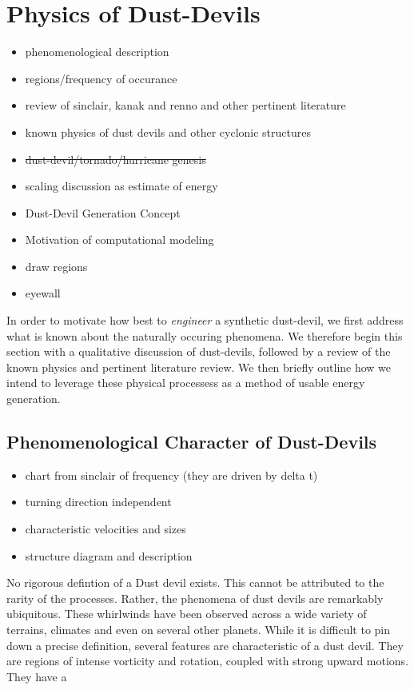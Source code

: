 \section{Physics of Dust-Devils}
\label{sec:physics}
\begin{itemize}
\item phenomenological description
\item regions/frequency of occurance
\item review of sinclair, kanak and renno and other pertinent literature
\item known physics of dust devils and other cyclonic structures
\item \st{dust-devil/tornado/hurricane genesis}
\item scaling discussion as estimate of energy
\item Dust-Devil Generation Concept
\item Motivation of computational modeling
\item draw regions
\item eyewall
\end{itemize}

In order to motivate how best to \textit{engineer} a synthetic
dust-devil, we first address what is known about the naturally occuring
phenomena. We therefore begin this section with a qualitative discussion
of dust-devils, followed by a review of the known physics and pertinent 
literature review. We then briefly outline how we intend to leverage
these physical processess as a method of usable energy generation. 


\subsection{Phenomenological Character of Dust-Devils}
\begin{itemize}
 \item chart from sinclair of frequency (they are driven by delta t)
 \item turning direction independent
 \item characteristic velocities and sizes
 \item structure diagram and description
\end{itemize}

No rigorous defintion of a Dust devil exists. This cannot be attributed
to the rarity of the processes. Rather, the phenomena of dust devils are
remarkably ubiquitous. These whirlwinds have been
observed across a wide variety of terrains, climates and even on several
other planets. While it is difficult to pin down a precise definition,
several features are characteristic of a dust devil. They are regions of
intense vorticity and rotation, coupled with strong upward motions. They
have a 

